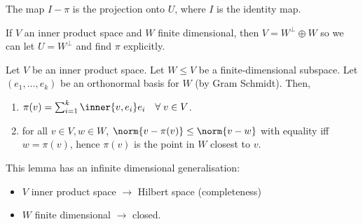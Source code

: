 \begin{remark}
	The map $I - \pi$ is the projection onto $U$, where $I$ is the identity map.
\end{remark}

\begin{remark}
	If $V$ an inner product space and $W$ finite dimensional, then $V = W^\perp \oplus W$ so we can let $U = W^\perp$ and find $\pi$ explicitly.
\end{remark} 

\begin{lemma}
	Let $V$ be an inner product space.
	Let $W \leq V$ be a finite-dimensional subspace.
	Let $(e_1, \dots, e_k)$ be an orthonormal basis for $W$ (by Gram Schmidt).
	Then,
	\begin{enumerate}
		\item $\pi(v) = \sum_{i=1}^k \inner{v, e_i} e_i \quad \forall \; v \in V$.
		\item for all $v \in V, w \in W$, $\norm{v - \pi(v)} \leq \norm{v - w}$ with equality iff $w = \pi(v)$, hence $\pi(v)$ is the point in $W$ closest to $v$.
	\end{enumerate}
\end{lemma}

\begin{remark}
	This lemma has an infinite dimensional generalisation:
	\begin{itemize}
		\item $V$ inner product space $\to$ Hilbert space (completeness)
		\item $W$ finite dimensional $\to$ closed.
	\end{itemize} 
\end{remark} 

